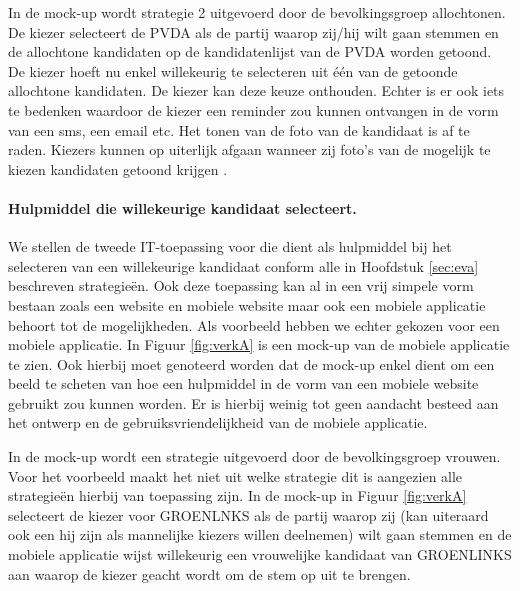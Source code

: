 In de mock-up wordt strategie 2 uitgevoerd door de bevolkingsgroep allochtonen. De kiezer selecteert de PVDA als de partij waarop zij/hij wilt gaan stemmen en de allochtone kandidaten op de kandidatenlijst van de PVDA worden getoond. De kiezer hoeft nu enkel willekeurig te selecteren uit één van de getoonde allochtone kandidaten. De kiezer kan deze keuze onthouden. Echter is er ook iets te bedenken waardoor de kiezer een reminder zou kunnen ontvangen in de vorm van een sms, een email etc. Het tonen van de foto van de kandidaat is af te raden. Kiezers kunnen op uiterlijk afgaan wanneer zij foto's van de mogelijk te kiezen kandidaten getoond krijgen \citep{banducci2008ballot,lawson2010looking}. 


\paragraph{Hulpmiddel die willekeurige kandidaat selecteert.}
We stellen de tweede IT-toepassing voor die dient als hulpmiddel bij het selecteren van een willekeurige kandidaat conform alle in Hoofdstuk \ref{sec:eva} beschreven strategie\"{e}n. Ook deze toepassing kan al in een vrij simpele vorm bestaan zoals een website en mobiele website maar ook een mobiele applicatie behoort tot de mogelijkheden. Als voorbeeld hebben we echter gekozen voor een mobiele applicatie. In Figuur \ref{fig:verkA} is een mock-up van de mobiele applicatie te zien. Ook hierbij moet genoteerd worden dat de mock-up enkel dient om een beeld te scheten van hoe een hulpmiddel in de vorm van een mobiele website gebruikt zou kunnen worden. Er is hierbij weinig tot geen aandacht besteed aan het ontwerp en de gebruiksvriendelijkheid van de mobiele applicatie.

In de mock-up wordt een strategie uitgevoerd door de bevolkingsgroep vrouwen. Voor het voorbeeld maakt het niet uit welke strategie dit is aangezien alle strategie\"{e}n hierbij van toepassing zijn. In de mock-up in Figuur \ref{fig:verkA} selecteert de kiezer voor GROENLNKS als de partij waarop zij (kan uiteraard ook een hij zijn als mannelijke kiezers willen deelnemen) wilt gaan stemmen en de mobiele applicatie wijst willekeurig een vrouwelijke kandidaat van GROENLINKS aan waarop de kiezer geacht wordt om de stem op uit te brengen. 


